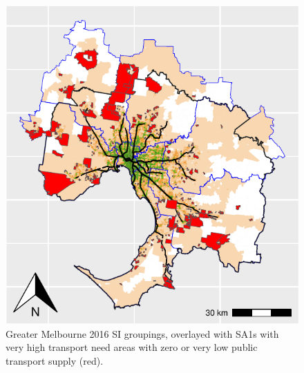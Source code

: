 \documentclass[preprint, 3p,
authoryear]{elsarticle} %
\begin{document}
\begin{figure}
\includegraphics[width=1\linewidth]{Leveraging_GTFS_to_assess_transit_supply_Transport_Geography_files/figure-latex/Greater_Melbourne_2016_needs_gap_map_figure-1} \caption{Greater Melbourne 2016 SI groupings, overlayed with SA1s with very high transport need areas with zero or very low public transport supply (red).}\label{fig:Greater_Melbourne_2016_needs_gap_map_figure}
\end{figure}
\end{document}
